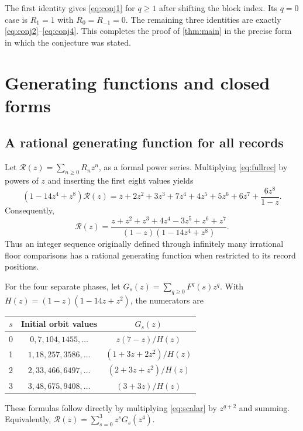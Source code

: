 \documentclass[11pt]{article}
\theoremstyle{definition}
\numberwithin{equation}{section}
\begin{document}
The first identity gives \eqref{eq:conj1} for $q\ge1$ after shifting the block index. Its $q=0$ case is $R_1=1$ with $R_0=R_{-1}=0$. The remaining three identities are exactly \eqref{eq:conj2}--\eqref{eq:conj4}. This completes the proof of \cref{thm:main} in the precise form in which the conjecture was stated.

\section{Generating functions and closed forms}\label{sec:gf}
\subsection{A rational generating function for all records}
Let $\mathscr R(z)=\sum_{n\ge0}R_nz^n$, as a formal power series. Multiplying \eqref{eq:fullrec} by powers of $z$ and inserting the first eight values yields
\[
 (1-14z^4+z^8)\mathscr R(z)
 =z+2z^2+3z^3+7z^4+4z^5+5z^6+6z^7+\frac{6z^8}{1-z}.
\]
Consequently,
\begin{equation}\label{eq:gf}
 \boxed{\mathscr R(z)=
 \frac{z+z^2+z^3+4z^4-3z^5+z^6+z^7}
 {(1-z)(1-14z^4+z^8)}.}
\end{equation}
Thus an integer sequence originally defined through infinitely many irrational floor comparisons has a rational generating function when restricted to its record positions.

For the four separate phases, let $G_s(z)=\sum_{q\ge0}F^q(s)z^q$. With $H(z)=(1-z)(1-14z+z^2)$, the numerators are
\begin{center}
\begin{tabular}{c|c|c}
\toprule
$s$ & Initial orbit values & $G_s(z)$\\
\midrule
0&$0,7,104,1455,\ldots$&$z(7-z)/H(z)$\\
1&$1,18,257,3586,\ldots$&$(1+3z+2z^2)/H(z)$\\
2&$2,33,466,6497,\ldots$&$(2+3z+z^2)/H(z)$\\
3&$3,48,675,9408,\ldots$&$(3+3z)/H(z)$\\
\bottomrule
\end{tabular}
\end{center}
These formulas follow directly by multiplying \eqref{eq:scalar} by $z^{q+2}$ and summing. Equivalently,
$\mathscr R(z)=\sum_{s=0}^3z^sG_s(z^4)$.
\end{document}
